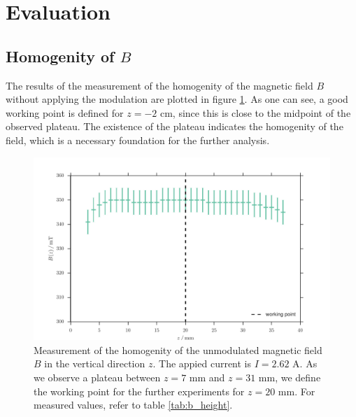 \section{Evaluation}
\subsection{Homogenity of $B$}
The results of the measurement of the homogenity of the magnetic field $B$ 
without applying the modulation are plotted in figure 
\ref{fig:b_height}. As one can see, a good working point is defined for $z = -2$ cm, since 
this is close to the midpoint of the observed plateau. The existence of the plateau indicates the homogenity 
of the field, which is a necessary foundation for the further analysis.
\begin{figure}[H]
    \centering
    \includegraphics[width=1.0\textwidth]{figures/b_height.pdf}
    \caption{   
        Measurement of the homogenity of the unmodulated magnetic field $B$ in the vertical direction $z$. 
        The appied current is $I = 2.62$ A. As we observe a plateau between $z = 7$ mm and $z = 31$ mm, 
        we define the working point for the further experiments for $z = 20$ mm.
        For measured values, refer to table \ref{tab:b_height}.
        }
    \label{fig:b_height}
\end{figure}
\FloatBarrier


